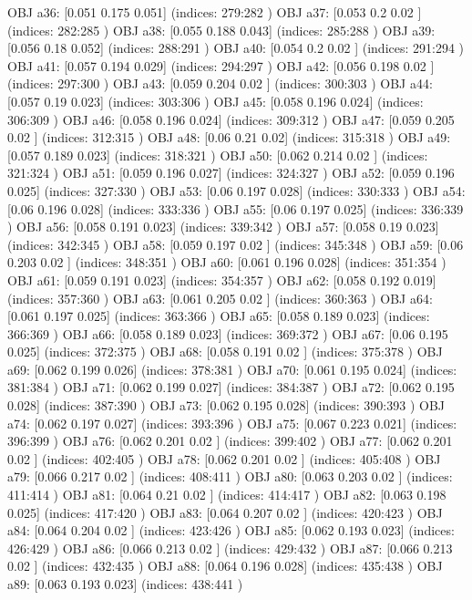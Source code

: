 OBJ a36: [0.051 0.175 0.051] (indices: 279:282 )
OBJ a37: [0.053 0.2   0.02 ] (indices: 282:285 )
OBJ a38: [0.055 0.188 0.043] (indices: 285:288 )
OBJ a39: [0.056 0.18  0.052] (indices: 288:291 )
OBJ a40: [0.054 0.2   0.02 ] (indices: 291:294 )
OBJ a41: [0.057 0.194 0.029] (indices: 294:297 )
OBJ a42: [0.056 0.198 0.02 ] (indices: 297:300 )
OBJ a43: [0.059 0.204 0.02 ] (indices: 300:303 )
OBJ a44: [0.057 0.19  0.023] (indices: 303:306 )
OBJ a45: [0.058 0.196 0.024] (indices: 306:309 )
OBJ a46: [0.058 0.196 0.024] (indices: 309:312 )
OBJ a47: [0.059 0.205 0.02 ] (indices: 312:315 )
OBJ a48: [0.06 0.21 0.02] (indices: 315:318 )
OBJ a49: [0.057 0.189 0.023] (indices: 318:321 )
OBJ a50: [0.062 0.214 0.02 ] (indices: 321:324 )
OBJ a51: [0.059 0.196 0.027] (indices: 324:327 )
OBJ a52: [0.059 0.196 0.025] (indices: 327:330 )
OBJ a53: [0.06  0.197 0.028] (indices: 330:333 )
OBJ a54: [0.06  0.196 0.028] (indices: 333:336 )
OBJ a55: [0.06  0.197 0.025] (indices: 336:339 )
OBJ a56: [0.058 0.191 0.023] (indices: 339:342 )
OBJ a57: [0.058 0.19  0.023] (indices: 342:345 )
OBJ a58: [0.059 0.197 0.02 ] (indices: 345:348 )
OBJ a59: [0.06  0.203 0.02 ] (indices: 348:351 )
OBJ a60: [0.061 0.196 0.028] (indices: 351:354 )
OBJ a61: [0.059 0.191 0.023] (indices: 354:357 )
OBJ a62: [0.058 0.192 0.019] (indices: 357:360 )
OBJ a63: [0.061 0.205 0.02 ] (indices: 360:363 )
OBJ a64: [0.061 0.197 0.025] (indices: 363:366 )
OBJ a65: [0.058 0.189 0.023] (indices: 366:369 )
OBJ a66: [0.058 0.189 0.023] (indices: 369:372 )
OBJ a67: [0.06  0.195 0.025] (indices: 372:375 )
OBJ a68: [0.058 0.191 0.02 ] (indices: 375:378 )
OBJ a69: [0.062 0.199 0.026] (indices: 378:381 )
OBJ a70: [0.061 0.195 0.024] (indices: 381:384 )
OBJ a71: [0.062 0.199 0.027] (indices: 384:387 )
OBJ a72: [0.062 0.195 0.028] (indices: 387:390 )
OBJ a73: [0.062 0.195 0.028] (indices: 390:393 )
OBJ a74: [0.062 0.197 0.027] (indices: 393:396 )
OBJ a75: [0.067 0.223 0.021] (indices: 396:399 )
OBJ a76: [0.062 0.201 0.02 ] (indices: 399:402 )
OBJ a77: [0.062 0.201 0.02 ] (indices: 402:405 )
OBJ a78: [0.062 0.201 0.02 ] (indices: 405:408 )
OBJ a79: [0.066 0.217 0.02 ] (indices: 408:411 )
OBJ a80: [0.063 0.203 0.02 ] (indices: 411:414 )
OBJ a81: [0.064 0.21  0.02 ] (indices: 414:417 )
OBJ a82: [0.063 0.198 0.025] (indices: 417:420 )
OBJ a83: [0.064 0.207 0.02 ] (indices: 420:423 )
OBJ a84: [0.064 0.204 0.02 ] (indices: 423:426 )
OBJ a85: [0.062 0.193 0.023] (indices: 426:429 )
OBJ a86: [0.066 0.213 0.02 ] (indices: 429:432 )
OBJ a87: [0.066 0.213 0.02 ] (indices: 432:435 )
OBJ a88: [0.064 0.196 0.028] (indices: 435:438 )
OBJ a89: [0.063 0.193 0.023] (indices: 438:441 )
